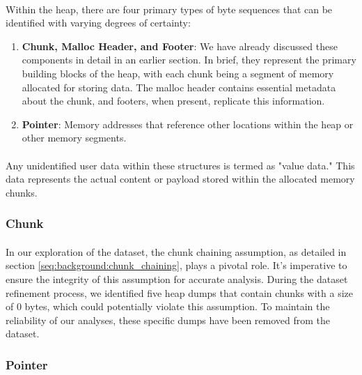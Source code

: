         \paragraph{}Within the heap, there are four primary types of byte sequences that can be identified with varying degrees of certainty:
        
        \begin{enumerate}
            \item \textbf{Chunk, Malloc Header, and Footer}: We have already discussed these components in detail in an earlier section. In brief, they represent the primary building blocks of the heap, with each chunk being a segment of memory allocated for storing data. The malloc header contains essential metadata about the chunk, and footers, when present, replicate this information.
            \item \textbf{Pointer}: Memory addresses that reference other locations within the heap or other memory segments.
        \end{enumerate}
        
        \paragraph{}Any unidentified user data within these structures is termed as "value data." This data represents the actual content or payload stored within the allocated memory chunks.

        \subsubsection{Chunk}
        \paragraph{}In our exploration of the dataset, the chunk chaining assumption, as detailed in section \ref{seq:background:chunk_chaining}, plays a pivotal role. It's imperative to ensure the integrity of this assumption for accurate analysis. During the dataset refinement process, we identified five heap dumps that contain chunks with a size of 0 bytes, which could potentially violate this assumption. To maintain the reliability of our analyses, these specific dumps have been removed from the dataset. 
        
        \subsubsection{Pointer}
